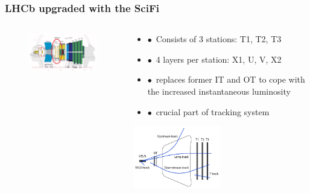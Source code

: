 \documentclass[aspectratio=1610, 12pt, xcolor=dvipsnames]{beamer}
\begin{document}
\begin{frame}\frametitle{LHCb upgraded with the SciFi}
  \begin{columns}
    \begin{column}[c]{0.48\textwidth}
      \begin{figure}
        \includegraphics[width=\textwidth]{logos/upgrade_lhcb.png}
      \end{figure}
    \end{column}
    \begin{column}{0.48\textwidth}
      \begin{itemize}
        \item $\bullet$\, Consists of 3 stations: T1, T2, T3
        \item $\bullet$\, 4 layers per station: X1, U, V, X2
	\item $\bullet$\, replaces former IT and OT to cope with the increased instantaneous luminosity
	\item $\bullet$\, crucial part of tracking system
      \end{itemize}
      \includegraphics[width=0.5\textwidth]{track.png}
    \end{column}
  \end{columns}
\end{frame}
\end{document}
